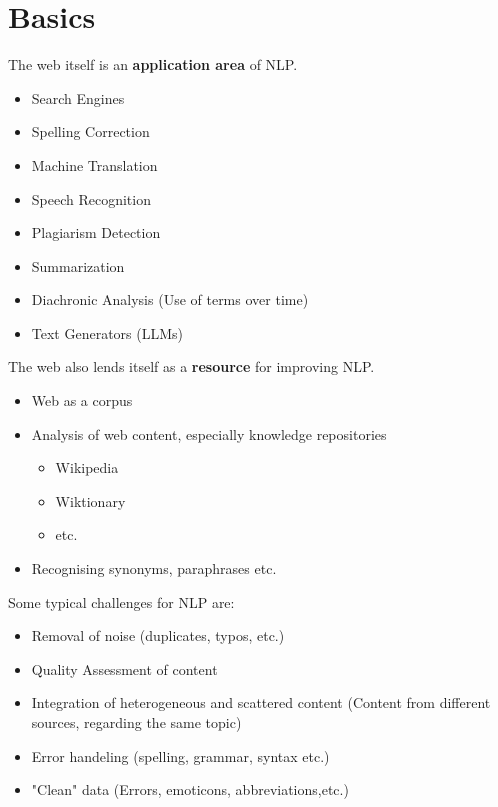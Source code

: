 \documentclass[
../../NLP4W_Summary.tex,
]
{subfiles}
\begin{document}
\section{Basics}
The web itself is an \textbf{application area} of NLP. 

\begin{defbox}
    \begin{itemize}
        \item Search Engines
        \item Spelling Correction
        \item Machine Translation
        \item Speech Recognition
        \item Plagiarism Detection
        \item Summarization
        \item Diachronic Analysis (Use of terms over time)
        \item Text Generators (LLMs)
    \end{itemize}
\end{defbox}

The web also lends itself as a \textbf{resource} for improving NLP.

\begin{defbox}
    \begin{itemize}
        \item Web as a corpus
        \item Analysis of web content, especially knowledge repositories
        \begin{itemize}
            \item Wikipedia
            \item Wiktionary
            \item etc.
        \end{itemize}
        \item Recognising synonyms, paraphrases etc.
    \end{itemize}
\end{defbox}

Some typical challenges for NLP are:

\begin{defbox}
    \begin{itemize}
        \item Removal of noise (duplicates, typos, etc.)
        \item Quality Assessment of content
        \item Integration of heterogeneous and scattered content (Content from different sources, regarding the same topic)
        \item Error handeling (spelling, grammar, syntax etc.)
        \item "Clean" data (Errors, emoticons, abbreviations,etc.)
    \end{itemize}
\end{defbox}
\end{document}
